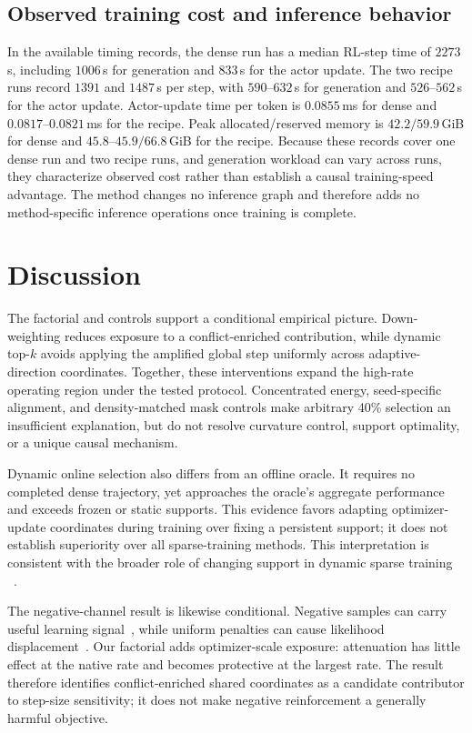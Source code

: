 \documentclass[5p,times]{elsarticle}
\begin{document}
\subsection{Observed training cost and inference behavior}
In the available timing records, the dense run has a median RL-step time of
$2273$\,s, including $1006$\,s for generation and $833$\,s for the actor update.
The two recipe runs record $1391$ and $1487$\,s per step, with $590$--$632$\,s
for generation and $526$--$562$\,s for the actor update. Actor-update time per
token is $0.0855$\,ms for dense and $0.0817$--$0.0821$\,ms for the recipe. Peak
allocated/reserved memory is $42.2/59.9$\,GiB for dense and
$45.8$--$45.9/66.8$\,GiB for the recipe. Because these records cover one dense
run and two recipe runs, and generation workload can vary across runs, they
characterize observed cost rather than establish a causal training-speed
advantage. The method changes no inference graph and therefore adds no
method-specific inference operations once training is complete.

\section{Discussion}\label{sec:discussion}
The factorial and controls support a conditional empirical picture.
Down-weighting reduces exposure to a conflict-enriched contribution, while
dynamic top-$k$ avoids applying the amplified global step uniformly across
adaptive-direction coordinates. Together, these interventions expand the
high-rate operating region under the tested protocol. Concentrated energy,
seed-specific alignment, and density-matched mask controls make arbitrary
40\% selection an insufficient explanation, but do not resolve curvature
control, support optimality, or a unique causal mechanism.

Dynamic online selection also differs from an offline oracle. It requires no
completed dense trajectory, yet approaches the oracle's aggregate performance
and exceeds frozen or static supports. This evidence favors adapting
optimizer-update coordinates during training over fixing a persistent support;
it does not establish superiority over all sparse-training methods. This
interpretation is consistent with the broader role of changing support in
dynamic sparse training
~\cite{evci2020rigl,you2020earlybird}.

The negative-channel result is likewise conditional. Negative samples can
carry useful learning signal~\cite{zhu2025negativereinforcement}, while uniform
penalties can cause likelihood displacement~\cite{deng2025negativegrad}. Our
factorial adds optimizer-scale exposure: attenuation has little effect at the
native rate and becomes protective at the largest rate. The result therefore
identifies conflict-enriched shared coordinates as a candidate contributor to
step-size sensitivity; it does not make negative reinforcement a generally
harmful objective.
\end{document}
